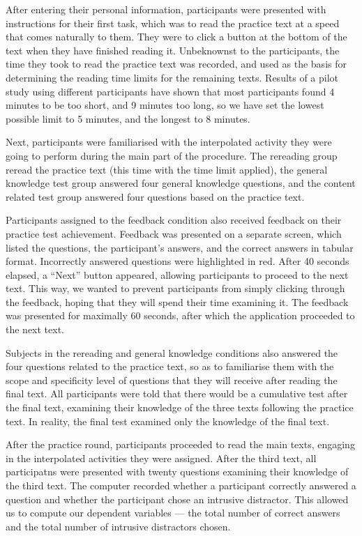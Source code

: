 \documentclass[11pt,]{article}
\begin{document}
After entering their personal information, participants were presented
with instructions for their first task, which was to read the practice
text at a speed that comes naturally to them. They were to click a
button at the bottom of the text when they have finished reading it.
Unbeknownst to the participants, the time they took to read the practice
text was recorded, and used as the basis for determining the reading
time limits for the remaining texts. Results of a pilot study using
different participants have shown that most participants found 4 minutes
to be too short, and 9 minutes too long, so we have set the lowest
possible limit to 5 minutes, and the longest to 8 minutes.

Next, participants were familiarised with the interpolated activity they
were going to perform during the main part of the procedure. The
rereading group reread the practice text (this time with the time limit
applied), the general knowledge test group answered four general
knowledge questions, and the content related test group answered four
questions based on the practice text.

Participants assigned to the feedback condition also received feedback
on their practice test achievement. Feedback was presented on a separate
screen, which listed the questions, the participant's answers, and the
correct answers in tabular format. Incorrectly answered questions were
highlighted in red. After 40 seconds elapsed, a ``Next'' button
appeared, allowing participants to proceed to the next text. This way,
we wanted to prevent participants from simply clicking through the
feedback, hoping that they will spend their time examining it. The
feedback was presented for maximally 60 seconds, after which the
application proceeded to the next text.

Subjects in the rereading and general knowledge conditions also answered
the four questions related to the practice text, so as to familiarise
them with the scope and specificity level of questions that they will
receive after reading the final text. All participants were told that
there would be a cumulative test after the final text, examining their
knowledge of the three texts following the practice text. In reality,
the final test examined only the knowledge of the final text.

After the practice round, participants proceeded to read the main texts,
engaging in the interpolated activities they were assigned. After the
third text, all participatns were presented with twenty questions
examining their knowledge of the third text. The computer recorded
whether a participant correctly answered a question and whether the
participant chose an intrusive distractor. This allowed us to compute
our dependent variables --- the total number of correct answers and the
total number of intrusive distractors chosen.

\onecolumn



\end{document}
